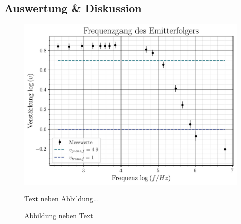 \subsection{Auswertung \& Diskussion}

    \begin{figure}[H]
        \centering
        \begin{minipage}{0.4\textwidth}
            \centering
            \includegraphics[width=\linewidth]{figs/V4_2e_emitter.jpg}
            \caption{Abbildung neben Text}
        \end{minipage} 
        \hspace{1cm}
        \begin{minipage}{0.4\textwidth}
            Text neben Abbildung... \cite{Oszillograph}
        \end{minipage}
    \end{figure}